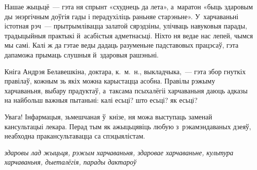 Нашае жыцьцё~--- гэта ня спрынт «схуднець да лета», а~маратон «быць здаровым ды энэргічным доўгія гады і перадухіліць раньняе старэньне». У~харчаваньні істотная рэч~--- прытрымлівацца залатой сярэдзіны, улічваць навуковыя парады, традыцыйныя практыкі й~асабістыя адметнасьці. Ніхто ня ведае нас лепей, чымся мы самі. Калі ж да гэтае веды дадаць разуменьне падставовых працэсаў, гэта дапаможа прымаць слушныя й~здаровыя рашэньні.

Кніга Андрэя Белавешкіна, доктара, к.~м.~н., выкладчыка,~--- гэта збор гнуткіх правілаў, кожным зь якіх можна карыстацца асобна. Правілы рэжыму харчаваньня, выбару прадуктаў, а~таксама псыхалёгіі харчаваньня даюць адказы на найбольш важныя пытаньні: калі есьці? што есьці? як есьці?

Увага! Інфармацыя, зьмешчаная ў~кнізе, ня можа выступаць заменай кансультацыі лекара. Перад тым як ажыцьцявіць любую з~рэкамэндаваных дзеяў, неабходна пракансультавацца са спэцыялістам.

\emph{здаровы лад жыцьця, рэжым харчаваньня, здаровае харчаваньне, культура харчаваньня, дыеталёгія, парады дактароў}
